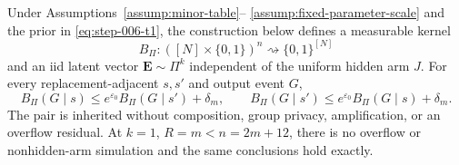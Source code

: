 \begin{proposition}
\label{prop:step-006-result}
Under Assumptions~\ref{assump:minor-table}--
\ref{assump:fixed-parameter-scale} and the prior in \eqref{eq:step-006-t1}, the
construction below defines a measurable kernel
\[
B_\Pi:([N]\times\{0,1\})^n\rightsquigarrow\{0,1\}^{[N]}
\]
and an iid latent vector $\mathbf E\sim\Pi^k$ independent of the uniform
hidden arm $J$.  For every replacement-adjacent $s,s'$ and output event
$G$,
\[
B_\Pi(G\mid s)\leq e^{\varepsilon_0}B_\Pi(G\mid s')+\delta_m,
\qquad
B_\Pi(G\mid s')\leq e^{\varepsilon_0}B_\Pi(G\mid s)+\delta_m.
\]
The pair is inherited without composition, group privacy, amplification,
or an overflow residual.  At $k=1$, $R=m<n=2m+12$, there is no overflow
or nonhidden-arm simulation and the same conclusions hold exactly.
\end{proposition}

